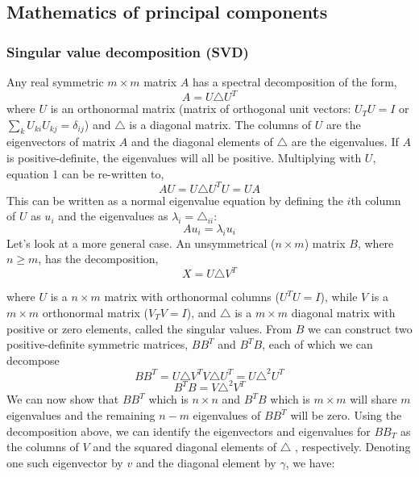 \documentclass[12pt,twoside]{article}
\begin{document}
\subsection{Mathematics of principal components}

\subsubsection{Singular value decomposition (SVD)}
\bigbreak
Any real symmetric $m \times m$ matrix $A$ has a spectral decomposition of the form,
\begin{equation}
A = U\triangle U^{T}
\end{equation}
\bigbreak
where $U$ is an orthonormal matrix (matrix of orthogonal unit vectors: $U_{T}U = I$ or $\sum_{k}U_{ki}U_{kj} = \delta_{ij}$) and $\triangle$ is a diagonal matrix. The columns of $U$ are the eigenvectors of matrix $A$ and the diagonal elements of $\triangle$ are the eigenvalues. If $A$ is positive-definite, the eigenvalues will all be positive. Multiplying with $U$, equation 1 can be re-written to,
\begin{equation}
AU = U\triangle U^{T}U = UA
\end{equation}
\bigbreak
This can be written as a normal eigenvalue equation by defining the $i$th column of $U$ as
$u_{i}$ and the eigenvalues as $\lambda_{i} = \triangle_{ii}$:
\begin{equation}
Au_{i} = \lambda_{i}u_{i}
\end{equation}
\bigbreak
Let's look at a more general case. An unsymmetrical ($n \times m$) matrix $B$, where $n \geq m$, has the decomposition,
\begin{equation}
X = U\triangle V^{T}
\end{equation}

where $U$ is a $n \times m$ matrix with orthonormal columns ($U^{T}U = I$), while $V$ is a $m \times m$ orthonormal matrix ($V_{T}V = I$), and $\triangle$ is a $m \times m$ diagonal matrix with positive or zero elements, called the singular values.
\bigbreak
From $B$ we can construct two positive-definite symmetric matrices, $BB^{T}$ and $B^{T}B$, each of which we can decompose
\begin{equation}
BB^{T} = U\triangle V^{T}V\triangle U^{T} = U\triangle^2U^{T}
\end{equation}
\begin{equation}
B^{T}B = V\triangle^2V^{T}
\end{equation}
\bigbreak
We can now show that $BB^{T}$ which is $n \times n$ and $B^{T}B$ which is $m \times m$ will share $m$ eigenvalues and the remaining $n - m$ eigenvalues of $BB^{T} $ will be zero.
\bigbreak
Using the decomposition above, we can identify the eigenvectors and eigenvalues for $BB_{T}$ as the columns of $V$ and the squared diagonal elements of $\triangle$ , respectively. Denoting one such eigenvector by $v$ and the diagonal element by $\gamma$, we have:
\end{document}

